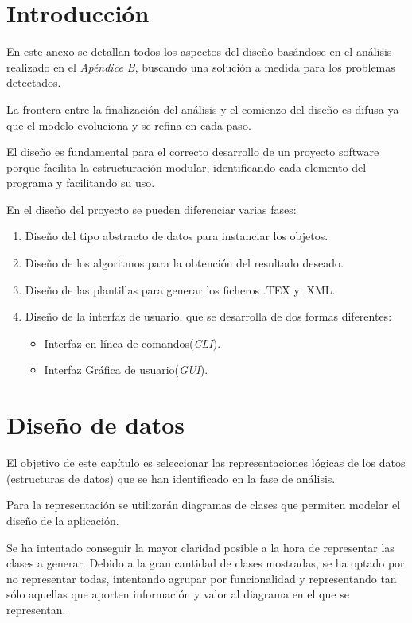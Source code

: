 
\section{Introducción}
En este anexo se detallan todos los aspectos del diseño basándose en el análisis realizado en el
\textit{Apéndice B}, buscando una solución a medida para los problemas detectados.

La frontera entre la finalización del análisis y el comienzo del diseño es difusa ya que el modelo evoluciona y se refina en cada paso.

El diseño es fundamental para el correcto desarrollo de un proyecto software porque facilita la estructuración modular, identificando cada elemento del programa y facilitando su uso.

En el diseño del proyecto se pueden diferenciar varias fases:
\begin{enumerate}
\item Diseño del tipo abstracto de datos para instanciar los objetos.
\item Diseño de los algoritmos para la obtención del resultado deseado.
\item Diseño de las plantillas para generar los ficheros .TEX y .XML.
\item Diseño de la interfaz de usuario, que se desarrolla de dos formas diferentes:
\begin{itemize}
\item Interfaz en línea de comandos(\textit{CLI}).
\item Interfaz Gráfica de usuario(\textit{GUI}).
\end{itemize}
\end{enumerate}

\section{Diseño de datos}
El objetivo de este capítulo es seleccionar las representaciones lógicas de los datos (estructuras
de datos) que se han identificado en la fase de análisis.

Para la representación se utilizarán diagramas de clases que permiten modelar el diseño de la aplicación.

Se ha intentado conseguir la mayor claridad posible a la hora de representar las clases a generar. Debido a la gran cantidad de clases mostradas, se ha optado por no representar todas, intentando agrupar por funcionalidad y representando tan sólo aquellas que aporten información y valor al diagrama en el que se representan.

